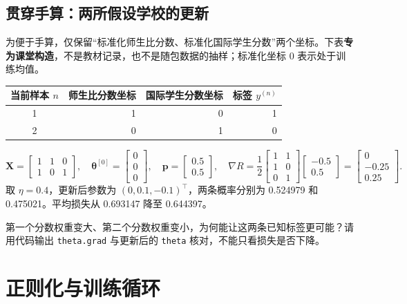\documentclass[UTF8,a4paper,11pt,fontset=fandol]{ctexart}
\begin{document}
\subsection{贯穿手算：两所假设学校的更新}
为便于手算，仅保留“标准化师生比分数、标准化国际学生分数”两个坐标。下表\textbf{专为课堂构造}，不是教材记录，也不是随包数据的抽样；标准化坐标 0 表示处于训练均值。
\begin{center}\begin{tabular}{crrr}\toprule
当前样本 $n$ & 师生比分数坐标 & 国际学生分数坐标 & 标签 $y^{(n)}$\\\midrule
1 & 1 & 0 & 1\\2 & 0 & 1 & 0\\\bottomrule\end{tabular}\end{center}
\begin{equation}
\mathbf X=\begin{bmatrix}1&1&0\\1&0&1\end{bmatrix},\quad
\boldsymbol\theta^{[0]}=\begin{bmatrix}0\\0\\0\end{bmatrix},\quad
\mathbf p=\begin{bmatrix}0.5\\0.5\end{bmatrix},\quad
\nabla R=\frac12\begin{bmatrix}1&1\\1&0\\0&1\end{bmatrix}\begin{bmatrix}-0.5\\0.5\end{bmatrix}
=\begin{bmatrix}0\\-0.25\\0.25\end{bmatrix}.
\end{equation}
取 $\eta=0.4$，更新后参数为 $(0,0.1,-0.1)^\top$，两条概率分别为 0.524979 和 0.475021。平均损失从 0.693147 降至 0.644397。
\begin{questionbox}
第一个分数权重变大、第二个分数权重变小，为何能让这两条已知标签更可能？请用代码输出 \texttt{theta.grad} 与更新后的 \texttt{theta} 核对，不能只看损失是否下降。
\end{questionbox}
\clearpage
\section{正则化与训练循环}
\end{document}
